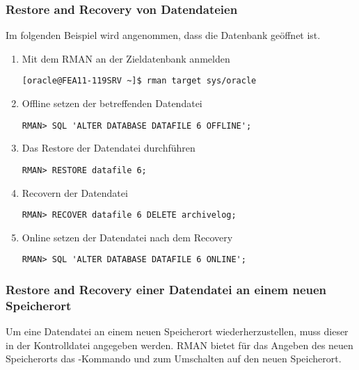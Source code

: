         \subsubsection{Restore and Recovery von Datendateien}
          Im folgenden Beispiel wird angenommen, dass die Datenbank ge\"offnet ist.
          \begin{enumerate}
            \item Mit dem RMAN an der Zieldatenbank anmelden
              \begin{lstlisting}[caption={An der Zieldatenbank anmelden},label=admin1474,language=rman]
[oracle@FEA11-119SRV ~]$ rman target sys/oracle
              \end{lstlisting}
            \item Offline setzen der betreffenden Datendatei
              \begin{lstlisting}[caption={Betreffende Datendatei Offline setzen},label=admin1475,language=rman,emph={[9]ALTER,DATABASE,DATAFILE,OFFLINE,IMMEDIATE},emphstyle={[9]\color{magenta}\bfseries}]
RMAN> SQL 'ALTER DATABASE DATAFILE 6 OFFLINE';
              \end{lstlisting}
            \item Das Restore der Datendatei durchf\"uhren
              \begin{lstlisting}[caption={Restore der betreffenden Datendatei},label=admin1476,language=rman]
RMAN> RESTORE datafile 6;
              \end{lstlisting}
            \item Recovern der Datendatei
              \begin{lstlisting}[caption={Recovery der Datendatei},label=admin1477,language=rman]
RMAN> RECOVER datafile 6 DELETE archivelog;
              \end{lstlisting}
            \item Online setzen der Datendatei nach dem Recovery
              \begin{lstlisting}[caption={Betreffende Datendatei Online setzen},label=admin1478,language=rman,emph={[9]ALTER,DATABASE,DATAFILE,ONLINE},emphstyle={[9]\color{magenta}\bfseries}]
RMAN> SQL 'ALTER DATABASE DATAFILE 6 ONLINE';
              \end{lstlisting}
          \end{enumerate}
        \subsubsection{Restore and Recovery einer Datendatei an einem neuen Speicherort}
          Um eine Datendatei an einem neuen Speicherort wiederherzustellen, muss dieser in der Kontrolldatei angegeben werden. RMAN bietet f\"ur das Angeben des neuen Speicherorts das -Kommando und  zum Umschalten auf den neuen Speicherort.

